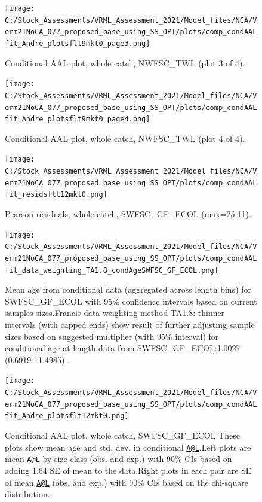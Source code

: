 \documentclass[
  english,
  a4paper,
]{article}
\begin{document}
\begin{figure}
\centering
\texttt{[image: C:/Stock\_Assessments/VRML\_Assessment\_2021/Model\_files/NCA/Verm21NoCA\_077\_proposed\_base\_using\_SS\_OPT/plots/comp\_condAALfit\_Andre\_plotsflt9mkt0\_page3.png]}
\caption{Conditional AAL plot, whole catch, NWFSC\_TWL (plot 3 of 4).\label{fig:comp_condAALfit_Andre_plotsflt9mkt0_page3}}
\end{figure}

\begin{figure}
\centering
\texttt{[image: C:/Stock\_Assessments/VRML\_Assessment\_2021/Model\_files/NCA/Verm21NoCA\_077\_proposed\_base\_using\_SS\_OPT/plots/comp\_condAALfit\_Andre\_plotsflt9mkt0\_page4.png]}
\caption{Conditional AAL plot, whole catch, NWFSC\_TWL (plot 4 of 4).\label{fig:comp_condAALfit_Andre_plotsflt9mkt0_page4}}
\end{figure}

\begin{figure}
\centering
\texttt{[image: C:/Stock\_Assessments/VRML\_Assessment\_2021/Model\_files/NCA/Verm21NoCA\_077\_proposed\_base\_using\_SS\_OPT/plots/comp\_condAALfit\_residsflt12mkt0.png]}
\caption{Pearson residuals, whole catch, SWFSC\_GF\_ECOL (max=25.11).\label{fig:comp_condAALfit_residsflt12mkt0}}
\end{figure}

\begin{figure}
\centering
\texttt{[image: C:/Stock\_Assessments/VRML\_Assessment\_2021/Model\_files/NCA/Verm21NoCA\_077\_proposed\_base\_using\_SS\_OPT/plots/comp\_condAALfit\_data\_weighting\_TA1.8\_condAgeSWFSC\_GF\_ECOL.png]}
\caption{Mean age from conditional data (aggregated across length bins) for SWFSC\_GF\_ECOL with 95\% confidence intervals based on current samples sizes.Francis data weighting method TA1.8: thinner intervals (with capped ends) show result of further adjusting sample sizes based on suggested multiplier (with 95\% interval) for conditional age-at-length data from SWFSC\_GF\_ECOL:1.0027 (0.6919-11.4985) .\label{fig:comp_condAALfit_data_weighting_TA1.8_condAgeSWFSC_GF_ECOL}}
\end{figure}

\begin{figure}
\centering
\texttt{[image: C:/Stock\_Assessments/VRML\_Assessment\_2021/Model\_files/NCA/Verm21NoCA\_077\_proposed\_base\_using\_SS\_OPT/plots/comp\_condAALfit\_Andre\_plotsflt12mkt0.png]}
\caption{Conditional AAL plot, whole catch, SWFSC\_GF\_ECOL
These plots show mean age and std. dev. in conditional \href{mailto:A@L}{\nolinkurl{A@L}}.Left plots are mean \href{mailto:A@L}{\nolinkurl{A@L}} by size-class (obs. and exp.) with 90\% CIs based on adding 1.64 SE of mean to the data.Right plots in each pair are SE of mean \href{mailto:A@L}{\nolinkurl{A@L}} (obs. and exp.) with 90\% CIs based on the chi-square distribution..\label{fig:comp_condAALfit_Andre_plotsflt12mkt0}}
\end{figure}
\end{document}
